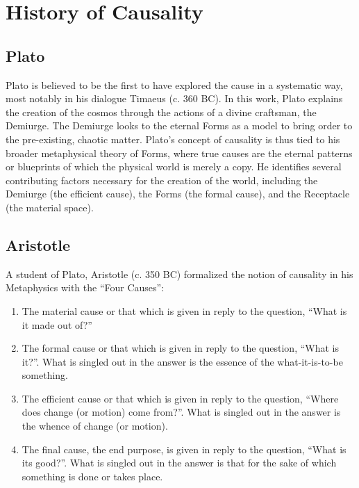 \section{History of Causality}
\label{sec:history}

\subsection{Plato}
\label{sec:history_plato}



Plato is believed to be the first to have explored the cause in a systematic way, most notably in his dialogue Timaeus\cite{archer1888timaeus} (c. 360 BC). In this work, Plato explains the creation of the cosmos through the actions of a divine craftsman, the Demiurge. The Demiurge looks to the eternal Forms as a model to bring order to the pre-existing, chaotic matter. Plato’s concept of causality is thus tied to his broader metaphysical theory of Forms, where true causes are the eternal patterns or blueprints of which the physical world is merely a copy. He identifies several contributing factors necessary for the creation of the world, including the Demiurge (the efficient cause), the Forms (the formal cause), and the Receptacle (the material space)\cite{archer1888timaeus}. 

\subsection{Aristotle}
\label{sec:history_aristotle}

A student of Plato, Aristotle (c. 350 BC) formalized the notion of causality in his Metaphysics\cite{heidegger1995aristotleMetaphysics} with the ``Four Causes''\cite{falcon2006aristotlecausality}:

\begin{enumerate}
    \item The material cause or that which is given in reply to the question, ``What is it made out of?''
    \item The formal cause or that which is given in reply to the question, ``What is it?''. What is singled out in the answer is the essence of the what-it-is-to-be something.
    \item The efficient cause or that which is given in reply to the question, ``Where does change (or motion) come from?''. What is singled out in the answer is the whence of change (or motion).
    \item The final cause, the end purpose, is given in reply to the question, ``What is its good?''. What is singled out in the answer is that for the sake of which something is done or takes place.
\end{enumerate}

